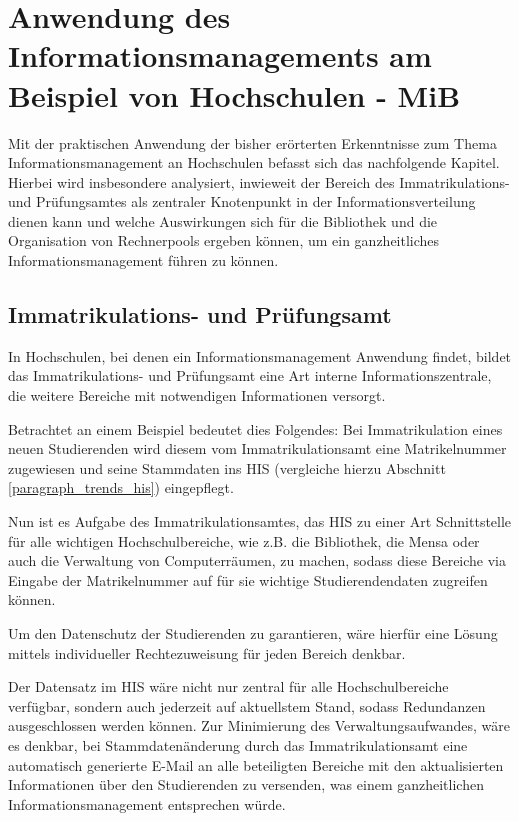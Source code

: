 \section{Anwendung des Informationsmanagements am Beispiel von Hochschulen - MiB}
\label{anwendung_des_inm_auf_hs}
Mit der praktischen Anwendung der bisher erörterten Erkenntnisse zum Thema 
Informationsmanagement an Hochschulen befasst sich das nachfolgende Kapitel. 
Hierbei wird insbesondere analysiert, inwieweit der Bereich des Immatrikulations- und 
Prüfungsamtes als zentraler Knotenpunkt in der Informationsverteilung dienen kann und 
welche Auswirkungen sich für die Bibliothek und die Organisation von Rechnerpools ergeben 
können, um ein ganzheitliches Informationsmanagement führen zu können.

\subsection{Immatrikulations- und Prüfungsamt}
\label{immatrikulations_und_pruefungsamt}
In Hochschulen, bei denen ein Informationsmanagement Anwendung findet, bildet das 
Immatrikulations- und Prüfungsamt eine Art interne Informationszentrale, die 
weitere Bereiche mit notwendigen Informationen versorgt. 

Betrachtet an einem Beispiel bedeutet dies Folgendes: Bei Immatrikulation eines neuen Studierenden wird diesem vom Immatrikulationsamt eine Matrikelnummer zugewiesen und seine Stammdaten ins HIS (vergleiche hierzu Abschnitt \ref{paragraph_trends_his}) eingepflegt. 

Nun ist es Aufgabe des Immatrikulationsamtes, das HIS zu einer Art Schnittstelle für alle wichtigen Hochschulbereiche, wie z.B. die Bibliothek, die Mensa oder auch die Verwaltung von Computerräumen, zu machen, sodass diese Bereiche via Eingabe der Matrikelnummer auf für sie wichtige Studierendendaten zugreifen können.

Um den Datenschutz der Studierenden zu garantieren, wäre hierfür eine Lösung mittels individueller Rechtezuweisung für jeden Bereich denkbar.

Der Datensatz im HIS wäre nicht nur zentral für alle Hochschulbereiche verfügbar, sondern 
auch jederzeit auf aktuellstem Stand, sodass Redundanzen ausgeschlossen werden können. 
Zur Minimierung des Verwaltungsaufwandes, wäre es denkbar, bei Stammdatenänderung 
durch das Immatrikulationsamt eine automatisch generierte E-Mail an alle beteiligten 
Bereiche mit den aktualisierten Informationen über den Studierenden zu versenden, was 
einem ganzheitlichen Informationsmanagement entsprechen würde.

